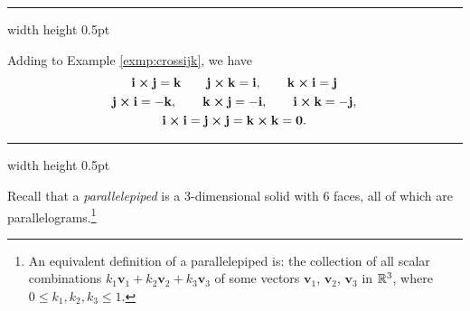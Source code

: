 \smallskip
\hrule width \textwidth height 0.5pt
\begin{exmp}\label{exmp:crossijkfull}
 Adding to Example \ref{exmp:crossijk}, we have
 \begin{gather*}
  \mathbf{i} \bm{\times} \mathbf{j} = \mathbf{k} \qquad \mathbf{j} \bm{\times} \mathbf{k} = \mathbf{i}, 
  \qquad
   \mathbf{k} \bm{\times} \mathbf{i} = \mathbf{j}\\
  \mathbf{j} \bm{\times} \mathbf{i} = -\mathbf{k}, 
  \qquad \mathbf{k} \bm{\times} \mathbf{j} = -\mathbf{i}, 
  \qquad
   \mathbf{i} \bm{\times} \mathbf{k} = -\mathbf{j},
   \\
  \mathbf{i} \bm{\times} \mathbf{i} = \mathbf{j} \bm{\times} \mathbf{j} = \mathbf{k} \bm{\times} \mathbf{k} =
  \mathbf{0}.
 \end{gather*}
\end{exmp}
\hrule width \textwidth height 0.5pt
\medskip

Recall that a \emph{parallelepiped} is a 3-dimensional solid with 6 faces, all of
which are parallelograms.\footnote{An equivalent definition of a  parallelepiped is: the collection of
all scalar combinations $k_{1}\mathbf{v}_{1} + k_{2}\mathbf{v}_{2} + k_{3}\mathbf{v}_{3}$ of some vectors
$\mathbf{v}_{1}$, $\mathbf{v}_{2}$, $\mathbf{v}_{3}$ in $\mathbb{R}^{3}$, where $0 \le k_{1}, k_{2}, k_{3} \le 1$.}


